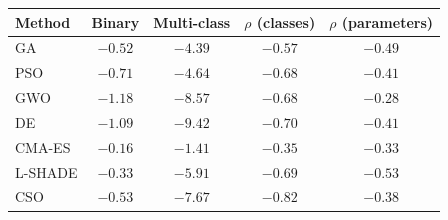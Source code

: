 \begin{tabular}{lcccc}
\toprule
Method & Binary & Multi-class & $\rho$ (classes) & $\rho$ (parameters) \\
\midrule
GA & $-0.52$ & $-4.39$ & $-0.57$ & $-0.49$ \\
PSO & $-0.71$ & $-4.64$ & $-0.68$ & $-0.41$ \\
GWO & $-1.18$ & $-8.57$ & $-0.68$ & $-0.28$ \\
DE & $-1.09$ & $-9.42$ & $-0.70$ & $-0.41$ \\
CMA-ES & $-0.16$ & $-1.41$ & $-0.35$ & $-0.33$ \\
L-SHADE & $-0.33$ & $-5.91$ & $-0.69$ & $-0.53$ \\
CSO & $-0.53$ & $-7.67$ & $-0.82$ & $-0.38$ \\
\bottomrule
\end{tabular}
